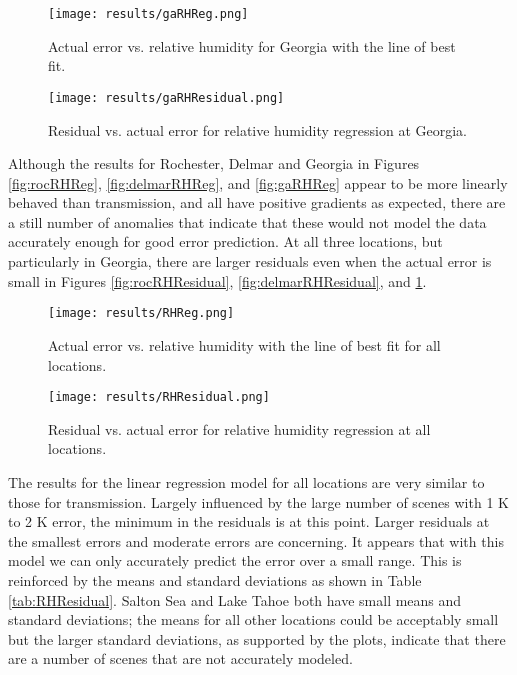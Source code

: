 \documentclass{book}
\begin{document}
\begin{figure}[H]
\begin{minipage}[b]{0.47\textwidth}
\centering
\texttt{[image: results/gaRHReg.png]}
\caption{Actual error vs. relative humidity for Georgia with the line of best fit.}
\label{fig:gaRHReg}
\end{minipage}
\begin{minipage}[b]{0.47\textwidth}
\centering
\texttt{[image: results/gaRHResidual.png]}
\caption{Residual vs. actual error for relative humidity regression at Georgia.}
\label{fig:gaRHResidual}
\end{minipage}
\end{figure}

Although the results for Rochester, Delmar and Georgia in Figures \ref{fig:rocRHReg}, \ref{fig:delmarRHReg}, and \ref{fig:gaRHReg} appear to be more linearly behaved than transmission, and all have positive gradients as expected, there are a still number of anomalies that indicate that these would not model the data accurately enough for good error prediction.  At all three locations, but particularly in Georgia, there are larger residuals even when the actual error is small in Figures \ref{fig:rocRHResidual}, \ref{fig:delmarRHResidual}, and \ref{fig:gaRHResidual}.

\begin{figure}[H]
\begin{minipage}[b]{0.47\textwidth}
\centering
\texttt{[image: results/RHReg.png]}
\caption{Actual error vs. relative humidity with the line of best fit for all locations.}
\label{fig:RHReg}
\end{minipage}
\begin{minipage}[b]{0.47\textwidth}
\centering
\texttt{[image: results/RHResidual.png]}
\caption{Residual vs. actual error for relative humidity regression at all locations.}
\label{fig:RHResidual}
\end{minipage}
\end{figure}

The results for the linear regression model for all locations are very similar to those for transmission.  Largely influenced by the large number of scenes with 1 K to 2 K error, the minimum in the residuals is at this point.  Larger residuals at the smallest errors and moderate errors are concerning.  It appears that with this model we can only accurately predict the error over a small range.  This is reinforced by the means and standard deviations as shown in Table \ref{tab:RHResidual}.  Salton Sea and Lake Tahoe both have small means and standard deviations; the means for all other locations could be acceptably small but the larger standard deviations, as supported by the plots, indicate that there are a number of scenes that are not accurately modeled.
\end{document}
